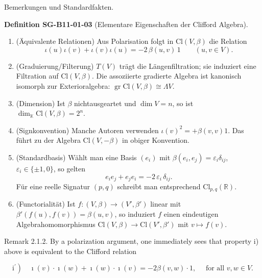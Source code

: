 \documentclass[10pt, letterpaper]{article}
\newcommand{\Cl}{\mathrm{Cl}}
\newcommand{\CustomHeading}[3]{%
  \par\medskip\noindent%
  \textbf{#1 #2} \textnormal{(#3)}.\enskip%
}
\newenvironment{DEF}[2]{\begin{unitbox}\CustomHeading{Definition}{#1}{#2}}{\end{unitbox}}
\begin{document}
Bemerkungen und Standardfakten.

\begin{DEF}{SG-B11-01-03}{Elementare Eigenschaften der Clifford Algebra}
\begin{enumerate}\itemsep0.2em
\item (Äquivalente Relationen) Aus Polarisation folgt in $\Cl(V,\beta)$ die Relation
\[
\iota(u)\iota(v)+\iota(v)\iota(u)=-2\,\beta(u,v)\,1\qquad(u,v\in V).
\]
\item (Graduierung/Filterung) $T(V)$ trägt die Längen­filtration; sie induziert eine
Filtration auf $\Cl(V,\beta)$. Die assoziierte gradierte Algebra ist kanonisch isomorph
zur Exterioralgebra: $\operatorname{gr}\Cl(V,\beta)\cong\Lambda V$.
\item (Dimension) Ist $\beta$ nichtausgeartet und $\dim V=n$, so ist
$\dim_{\mathbb K}\Cl(V,\beta)=2^n$.
\item (Signkonvention) Manche Autoren verwenden $\iota(v)^2=+\beta(v,v)1$. Das führt
zu der Algebra $\Cl(V,-\beta)$ in obiger Konvention.
\item (Standardbasis) Wählt man eine Basis $(e_i)$ mit $\beta(e_i,e_j)=\varepsilon_i\delta_{ij}$,
$\varepsilon_i\in\{\pm1,0\}$, so gelten
\[
e_i e_j + e_j e_i = -2\,\varepsilon_i\,\delta_{ij}.
\]
Für eine reelle Signatur $(p,q)$ schreibt man entsprechend $\Cl_{p,q}(\mathbb R)$.
\item (Functorialität) Ist $f:(V,\beta)\to(V',\beta')$ linear mit $\beta' (f(u),f(v))=\beta(u,v)$,
so induziert $f$ einen eindeutigen Algebrahomomorphismus $\Cl(V,\beta)\to\Cl(V',\beta')$
mit $v\mapsto f(v)$.
\end{enumerate}
\end{DEF}





Remark 2.1.2. By a polarization argument, one immediately sees that property i) above is equivalent to the Clifford relation

$$
\left.\mathrm{i}^{\prime}\right) \quad \imath(v) \cdot \imath(w)+\imath(w) \cdot \imath(v)=-2 \beta(v, w) \cdot 1, \quad \text { for all } v, w \in V .
$$
\end{document}
